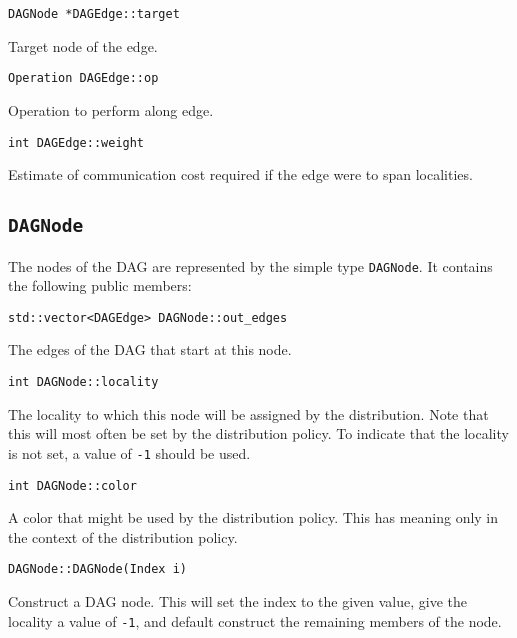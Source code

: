 \begin{lstlisting}
DAGNode *DAGEdge::target
\end{lstlisting}

\noindent Target node of the edge.

\begin{lstlisting}
Operation DAGEdge::op
\end{lstlisting}

\noindent Operation to perform along edge.

\begin{lstlisting}
int DAGEdge::weight
\end{lstlisting}

\noindent Estimate of communication cost required if the edge were to span
localities.


\subsection{\texttt{DAGNode}}

The nodes of the DAG are represented by the simple type \texttt{DAGNode}. It
contains the following public members:

\begin{lstlisting}
std::vector<DAGEdge> DAGNode::out_edges
\end{lstlisting}

\noindent The edges of the DAG that start at this node.

\begin{lstlisting}
int DAGNode::locality
\end{lstlisting}

\noindent The locality to which this node will be assigned by the
distribution. Note that this will most often be set by the distribution policy.
To indicate that the locality is not set, a value of \texttt{-1} should be used.

\begin{lstlisting}
int DAGNode::color
\end{lstlisting}

\noindent A color that might be used by the distribution policy. This has
meaning only in the context of the distribution policy.

\begin{lstlisting}
DAGNode::DAGNode(Index i)
\end{lstlisting}

\noindent Construct a DAG node. This will set the index to the given value,
give the locality a value of \texttt{-1}, and default construct the remaining
members of the node.

